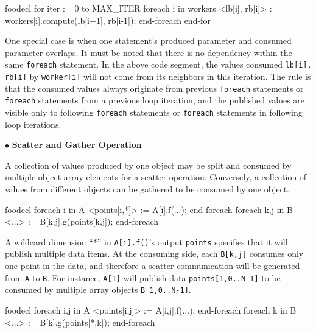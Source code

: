 \documentclass[10pt]{article}
\def\smallfbox#1{{\small \fbox{#1}}}
\def\code#1{{\small {\tt {#1}}}}
\begin{document}
\begin{SaveVerbatim}{foodecl}
  for iter := 0 to MAX_ITER
    foreach i in workers
      <lb[i], rb[i]> := workers[i].compute(lb[i+1], rb[i-1]);
    end-foreach
  end-for
\end{SaveVerbatim}
\vspace{0.1in}
\smallfbox{\BUseVerbatim{foodecl}}
\vspace{0.1in}

One special case is when one statement's produced parameter and consumed
parameter overlaps. It must be noted that there is no dependency within the same
\code{foreach} statement. In the above code segment, the values consumed
\code{lb[i], rb[i]} by \code{worker[i]} will not come from  
its neighbors in this iteration. The rule is that the consumed values always
originate from previous \code{foreach} statements or \code{foreach} statements
from a previous loop iteration, and the published values are visible only to
following \code{foreach} statements or \code{foreach} statements in following
loop iterations. 

$\bullet$ {\bf Scatter and Gather Operation}

A collection of values produced by one object may be split and consumed by
multiple object array elements for a scatter operation. Conversely, a collection
of values from different objects can be gathered to be consumed by one object.

\begin{SaveVerbatim}{foodecl}
  foreach i in A
    <points[i,*]> := A[i].f(...);
  end-foreach
  foreach k,j in B
    <...> := B[k,j].g(points[k,j]);
  end-foreach
\end{SaveVerbatim}
\vspace{0.1in}
\smallfbox{\BUseVerbatim{foodecl}}
\vspace{0.1in}

A wildcard dimension ``*'' in \code{A[i].f()}'s output \code{points} specifies
that it will publish multiple data items. At the consuming side, each
\code{B[k,j]} consumes only one point in the data, and therefore a scatter
communication will be generated from \code{A} to \code{B}. For instance,
\code{A[1]} will publish data \code{points[1,0..N-1]} to be consumed by multiple
array objects \code{B[1,0..N-1]}.  

\begin{SaveVerbatim}{foodecl}
  foreach i,j in A
    <points[i,j]> := A[i,j].f(...);
  end-foreach
  foreach k in B
    <...> := B[k].g(points[*,k]);
  end-foreach
\end{SaveVerbatim}
\vspace{0.1in}
\smallfbox{\BUseVerbatim{foodecl}}
\vspace{0.1in}
\end{document}
